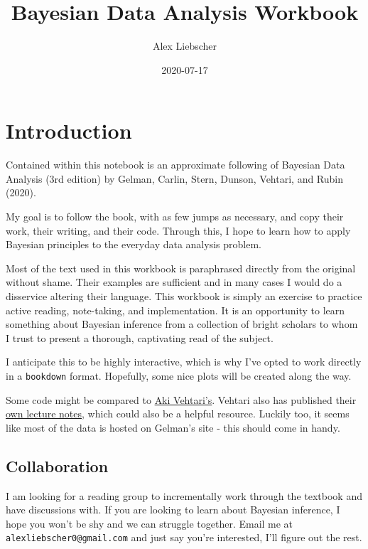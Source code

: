 \documentclass[]{book}
\title{Bayesian Data Analysis Workbook}
\author{Alex Liebscher}
\date{2020-07-17}
\begin{document}
\maketitle

{
\setcounter{tocdepth}{1}
\tableofcontents
}
\chapter{Introduction}\label{introduction}

Contained within this notebook is an approximate following of Bayesian
Data Analysis (3rd edition) by Gelman, Carlin, Stern, Dunson, Vehtari,
and Rubin (2020).

My goal is to follow the book, with as few jumps as necessary, and copy
their work, their writing, and their code. Through this, I hope to learn
how to apply Bayesian principles to the everyday data analysis problem.

Most of the text used in this workbook is paraphrased directly from the
original without shame. Their examples are sufficient and in many cases
I would do a disservice altering their language. This workbook is simply
an exercise to practice active reading, note-taking, and implementation.
It is an opportunity to learn something about Bayesian inference from a
collection of bright scholars to whom I trust to present a thorough,
captivating read of the subject.

I anticipate this to be highly interactive, which is why I've opted to
work directly in a \texttt{bookdown} format. Hopefully, some nice plots
will be created along the way.

Some code might be compared to
\href{https://github.com/avehtari/BDA_R_demos}{Aki Vehtari's}. Vehtari
also has published their
\href{https://github.com/avehtari/BDA_course_Aalto}{own lecture notes},
which could also be a helpful resource. Luckily too, it seems like most
of the data is hosted on Gelman's site - this should come in handy.

\section{Collaboration}\label{collaboration}

I am looking for a reading group to incrementally work through the
textbook and have discussions with. If you are looking to learn about
Bayesian inference, I hope you won't be shy and we can struggle
together. Email me at \texttt{alexliebscher0@gmail.com} and just say
you're interested, I'll figure out the rest.
\end{document}

